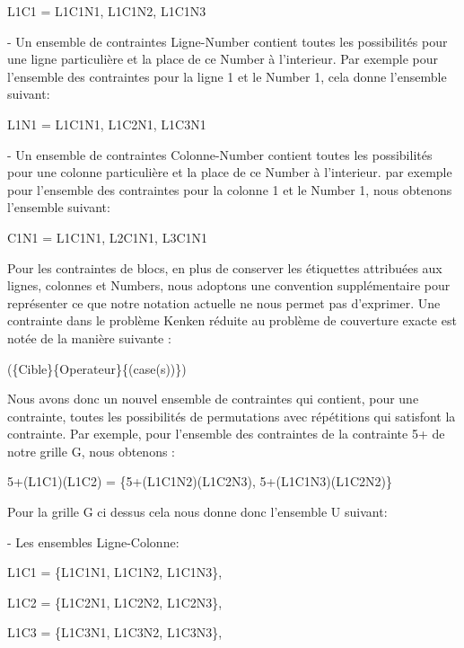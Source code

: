 \documentclass[1]{report}
\begin{document}
    L1C1 = {L1C1N1, L1C1N2, L1C1N3} \newline
    
    - Un ensemble de contraintes Ligne-Number contient toutes les possibilités pour une ligne particulière et la place de ce Number à l'interieur. Par exemple pour l'ensemble des contraintes pour la ligne 1 et le Number 1, cela donne l'ensemble suivant:
    
    L1N1 = {L1C1N1, L1C2N1, L1C3N1} \newline
    
    - Un ensemble de contraintes Colonne-Number contient toutes les possibilités pour une colonne particulière et la place de ce Number à l'interieur. par exemple pour l'ensemble des contraintes pour la colonne 1 et le Number 1, nous obtenons l'ensemble suivant:
    
    C1N1 = {L1C1N1, L2C1N1, L3C1N1} \newline
    
    Pour les contraintes de blocs, en plus de conserver les étiquettes attribuées aux lignes, colonnes et Numbers, nous adoptons une convention supplémentaire pour représenter ce que notre notation actuelle ne nous permet pas d'exprimer. Une contrainte dans le problème Kenken réduite au problème de couverture exacte est notée de la manière suivante : \newline
    
    (\{Cible\}\{Operateur\}\{(case(s))\}) \newline
    
    Nous avons donc un nouvel ensemble de contraintes qui contient, pour une contrainte, toutes les possibilités de permutations avec répétitions qui satisfont la contrainte. Par exemple, pour l'ensemble des contraintes de la contrainte 5+ de notre grille G, nous obtenons : \newline
    
    5+(L1C1)(L1C2) = \{5+(L1C1N2)(L1C2N3), 5+(L1C1N3)(L1C2N2)\} \newline
    
    Pour la grille G ci dessus cela nous donne donc l'ensemble U suivant: \newline
    
    - Les ensembles Ligne-Colonne: \newline
    
    L1C1 = \{L1C1N1, L1C1N2, L1C1N3\},
    
    L1C2 = \{L1C2N1, L1C2N2, L1C2N3\},
    
    L1C3 = \{L1C3N1, L1C3N2, L1C3N3\},
    
\end{document}

